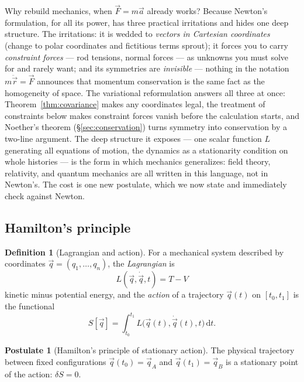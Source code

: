 \documentclass[11pt]{article}
\theoremstyle{plain}
\theoremstyle{definition}
\newtheorem{definition}[theorem]{Definition}
\newtheorem{postulate}[theorem]{Postulate}
\theoremstyle{remark}
\newcommand{\dd}{\mathrm{d}}
\newcommand{\vq}{\vec{q}}
\newcommand{\vr}{\vec{r}}
\begin{document}
Why rebuild mechanics, when $\vec F = m\vec a$ already works? Because
Newton's formulation, for all its power, has three practical irritations
and hides one deep structure. The irritations: it is wedded to
\emph{vectors in Cartesian coordinates} (change to polar coordinates and
fictitious terms sprout); it forces you to carry \emph{constraint forces}
--- rod tensions, normal forces --- as unknowns you must solve for and
rarely want; and its symmetries are \emph{invisible} --- nothing in the
notation $m\ddot{\vr} = \vec F$ announces that momentum conservation is
the same fact as the homogeneity of space. The variational reformulation
answers all three at once: Theorem~\ref{thm:covariance} makes any
coordinates legal, the treatment of constraints below makes constraint
forces vanish before the calculation starts, and Noether's theorem
(\S\ref{sec:conservation}) turns symmetry into conservation by a two-line
argument. The deep structure it exposes --- one scalar function $L$
generating all equations of motion, the dynamics as a stationarity
condition on whole histories --- is the form in which mechanics
generalizes: field theory, relativity, and quantum mechanics are all
written in this language, not in Newton's. The cost is one
new postulate, which we now state and immediately check against Newton.

\subsection{Hamilton's principle}
\label{sec:hamilton-principle}

\begin{definition}[Lagrangian and action]
For a mechanical system described by coordinates
$\vq = (q_1,\dots,q_n)$, the \emph{Lagrangian} is
\begin{equation}
  \boxed{\;L(\vq, \dot\vq, t) = T - V\;}
\end{equation}
kinetic minus potential energy, and the \emph{action} of a trajectory
$\vq(t)$ on $[t_0, t_1]$ is the functional
\begin{equation}
  \boxed{\;
  S[\vq] = \int_{t_0}^{t_1} L\bigl(\vq(t), \dot\vq(t), t\bigr)\,\dd t .
  \;}
\end{equation}
\end{definition}

\begin{postulate}[Hamilton's principle of stationary action]
\label{post:hamilton}
The physical trajectory between fixed configurations
$\vq(t_0) = \vq_A$ and $\vq(t_1) = \vq_B$ is a stationary point of the
action: $\delta S = 0$.
\end{postulate}
\end{document}

